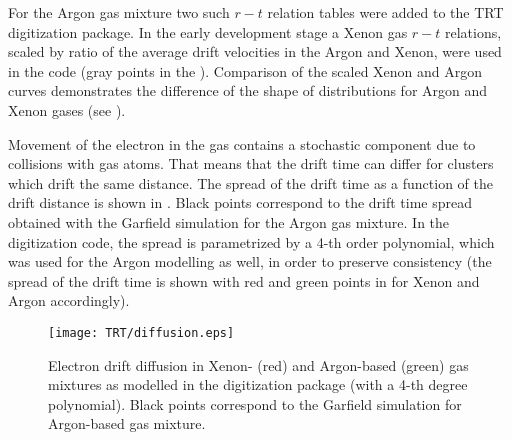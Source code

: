 For the Argon gas mixture two such $r-t$ relation tables were added to the TRT digitization package.
In the early development stage a Xenon gas $r-t$ relations, scaled by ratio of the average drift velocities in the Argon and Xenon, were used in the code 
(gray points in the ). 
Comparison of the scaled Xenon and Argon curves demonstrates the difference of the shape of distributions for Argon and Xenon gases (see ).


Movement of the electron in the gas contains a stochastic component due to collisions with gas atoms. 
That means that the drift time can differ for clusters which drift the same distance.
The spread of the drift time as a function of the drift distance is shown in .
Black points correspond to the drift time spread obtained with the Garfield simulation for the Argon gas mixture.
In the digitization code, the spread is parametrized by a 4-th order polynomial, which was used for the Argon modelling as well,
in order to preserve consistency (the spread of the drift time is shown with red and green points in  for Xenon and Argon accordingly).

\begin{figure}
\begin{center}
\texttt{[image: TRT/diffusion.eps]}
\caption{Electron drift diffusion in Xenon- (red) and Argon-based (green) gas mixtures as modelled in the digitization package (with a 4-th degree polynomial). 
Black points correspond to the Garfield simulation for Argon-based gas mixture.}
\label{fig:diffusion}
\end{center}
\end{figure}


